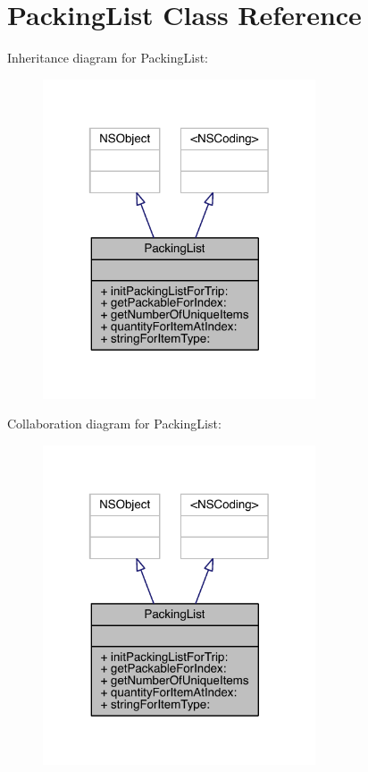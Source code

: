 \hypertarget{interface_packing_list}{\section{Packing\-List Class Reference}
\label{interface_packing_list}
}


Inheritance diagram for Packing\-List\-:\nopagebreak
\begin{figure}[H]
\begin{center}
\leavevmode
\includegraphics[width=229pt]{interface_packing_list__inherit__graph}
\end{center}
\end{figure}


Collaboration diagram for Packing\-List\-:\nopagebreak
\begin{figure}[H]
\begin{center}
\leavevmode
\includegraphics[width=229pt]{interface_packing_list__coll__graph}
\end{center}
\end{figure}
